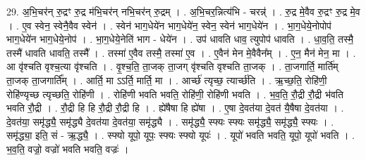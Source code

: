 \documentclass[17pt]{extarticle}
\begin{document}
29. अ॒भि॒चर॑न् रु॒द्रꣳ रु॒द्र म॑भि॒चर॑न् नभि॒चर॑न् रु॒द्रम् । . अ॒भि॒चर॒न्नित्य॑भि - चरन्न्॑ । . रु॒द्र मे॒वैव रु॒द्रꣳ रु॒द्र मे॒व । . ए॒व स्वेन॒ स्वेनै॒वैव स्वेन॑ । . स्वेन॑ भाग॒धेये॑न भाग॒धेये॑न॒ स्वेन॒ स्वेन॑ भाग॒धेये॑न । . भा॒ग॒धेये॒नोपोप॑ भाग॒धेये॑न भाग॒धेये॒नोप॑ । . भा॒ग॒धेये॒नेति॑ भाग - धेये॑न । . उप॑ धावति धाव॒ त्युपोप॑ धावति । . धा॒व॒ति॒ तस्मै॒ तस्मै॑ धावति धावति॒ तस्मै᳚ । . तस्मा॑ ए॒वैव तस्मै॒ तस्मा॑ ए॒व । . ए॒वैन॑ मेन मे॒वैवैन᳚म् । . ए॒न॒ मैन॑ मेन॒ मा । . आ वृ॑श्चति वृश्च॒त्या वृ॑श्चति । . वृ॒श्च॒ति॒ ता॒जक् ता॒जग् वृ॑श्चति वृश्चति ता॒जक् । . ता॒जगार्ति॒ मार्ति॑म् ता॒जक् ता॒जगार्ति᳚म् । . आर्ति॒ मा ऽऽर्ति॒ मार्ति॒ मा । . आर्च्छ॑ त्यृच्छ॒ त्यार्च्छ॑ति । . ऋ॒च्छ॒ति॒ रोहि॑णी॒ रोहि॑ण्यृच्छ त्यृच्छति॒ रोहि॑णी । . रोहि॑णी भवति भवति॒ रोहि॑णी॒ रोहि॑णी भवति । . भ॒व॒ति॒ रौ॒द्री रौ॒द्री भ॑वति भवति रौ॒द्री । . रौ॒द्री हि हि रौ॒द्री रौ॒द्री हि । . ह्ये॑षैषा हि ह्ये॑षा । . ए॒षा दे॒वत॑या दे॒वत॑ यै॒षैषा दे॒वत॑या । . दे॒वत॑या॒ समृ॑द्ध्यै॒ समृ॑द्ध्यै दे॒वत॑या दे॒वत॑या॒ समृ॑द्ध्यै । . समृ॑द्ध्यै॒ स्फ्यः स्फ्यः समृ॑द्ध्यै॒ समृ॑द्ध्यै॒ स्फ्यः । . समृ॑द्ध्या॒ इति॒ सं - ऋ॒द्ध्यै॒ । . स्फ्यो यूपो॒ यूपः॒ स्फ्यः स्फ्यो यूपः॑ । . यूपो॑ भवति भवति॒ यूपो॒ यूपो॑ भवति । . भ॒व॒ति॒ वज्रो॒ वज्रो॑ भवति भवति॒ वज्रः॑ । \newline
\end{document}
